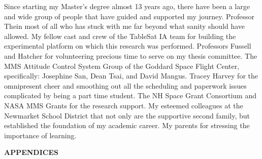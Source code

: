 \documentclass[11pt,doublespace]{unhthesis}
\begin{document}
\begin{acknowledgments}
Since starting my Master's degree almost 13 years ago, there have been a large and wide group of people that have guided and supported my journey.
Professor Thein most of all who has stuck with me far beyond what sanity should have allowed.
My fellow cast and crew of the TableSat IA team for building the experimental platform on which this research was performed.
Professors Fussell and Hatcher for volunteering precious time to serve on my thesis committee.
The MMS Attitude Control System Group of the Goddard Space Flight Center, specifically: Josephine San, Dean Tsai, and David Mangus.
Tracey Harvey for the omnipresent cheer and smoothing out all the scheduling and paperwork issues complicated by being a part time student.
The NH Space Grant Consortium and NASA MMS Grants for the research support.
My esteemed colleagues at the Newmarket School District that not only are the supportive second family, but established the foundation of my academic career.
My parents for stressing the importance of learning.
\end{acknowledgments}

\begin{singlespace}
  \tableofcontents
  \listoftables
  \listoffigures
\end{singlespace}

\begin{abstractpage}
\end{abstractpage}

















\newpage
\vspace*{100mm}
\begin{center}
  {\huge \bf APPENDICES}
\end{center}

\appendix
\pagebreak
\begin{singlespace}
  
  
  
  
\end{singlespace}
\end{document}
